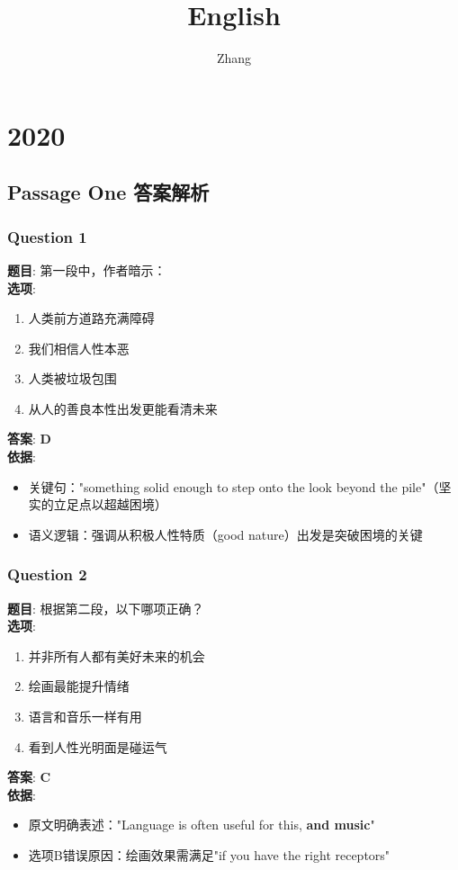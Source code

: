 \documentclass{article}
\title{English}
\author{Zhang}
\begin{document}
\maketitle

\section*{2020}
\subsection{Passage One 答案解析}


\subsubsection*{Question 1}
\textbf{题目}: 第一段中，作者暗示：\\
\textbf{选项}: 
\begin{enumerate}[label=\Alph*)]
    \item 人类前方道路充满障碍
    \item 我们相信人性本恶
    \item 人类被垃圾包围
    \item 从人的善良本性出发更能看清未来
\end{enumerate}
\textbf{答案}: \textbf{D} \\
\textbf{依据}:
\begin{itemize}
    \item 关键句："something solid enough to step onto the look beyond the pile"（坚实的立足点以超越困境）
    \item 语义逻辑：强调从积极人性特质（good nature）出发是突破困境的关键
\end{itemize}

\subsubsection*{Question 2}
\textbf{题目}: 根据第二段，以下哪项正确？\\
\textbf{选项}: 
\begin{enumerate}[label=\Alph*)]
    \item 并非所有人都有美好未来的机会
    \item 绘画最能提升情绪
    \item 语言和音乐一样有用
    \item 看到人性光明面是碰运气
\end{enumerate}
\textbf{答案}: \textbf{C} \\
\textbf{依据}:
\begin{itemize}
    \item 原文明确表述："Language is often useful for this, \textbf{and music}"
    \item 选项B错误原因：绘画效果需满足"if you have the right receptors"
\end{itemize}
\end{document}
